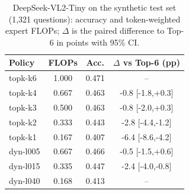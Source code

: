\begin{table}[t]\centering\small
\begin{tabular}{lccc}\toprule
Policy & FLOPs & Acc. & $\Delta$ vs Top-6 (pp)\\\midrule
topk-k6 & 1.000 & 0.471 & --\\
topk-k4 & 0.667 & 0.463 & -0.8 [-1.8,+0.3]\\
topk-k3 & 0.500 & 0.463 & -0.8 [-2.0,+0.3]\\
topk-k2 & 0.333 & 0.443 & -2.8 [-4.4,-1.2]\\
topk-k1 & 0.167 & 0.407 & -6.4 [-8.6,-4.2]\\
dyn-l005 & 0.667 & 0.466 & -0.5 [-1.5,+0.6]\\
dyn-l015 & 0.335 & 0.447 & -2.4 [-4.0,-0.8]\\
dyn-l040 & 0.168 & 0.413 & --\\
\bottomrule\end{tabular}
\caption{DeepSeek-VL2-Tiny on the synthetic test set (1,321 questions): accuracy and token-weighted expert FLOPs; $\Delta$ is the paired difference to Top-6 in points with 95\% CI.}
\label{tab:ds}
\end{table}